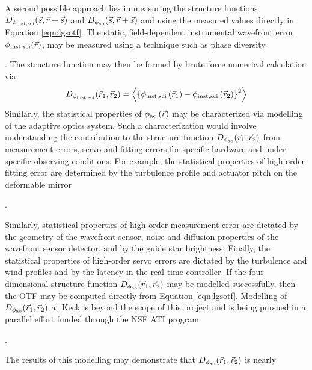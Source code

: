 A second possible approach lies in measuring the structure functions
$D_{\rm \phi_{inst,sci}}(\vec{s}, \vec{r} +\vec{s} )$ 
and
$D_{\rm \phi_{ao}}(\vec{s}, \vec{r} + \vec{s})$
and using the measured values directly in Equation
\ref{eqn:lgsotf}.  The static, field-dependent instrumental wavefront
error, $\phi_{\rm inst,sci}(\vec{r})$, may be measured using a technique 
such as phase diversity
\begin{notes}
\end{notes}
.  The
structure function may then be formed by brute force numerical
calculation via
\begin{equation}
\label{eqn:strfn_inst}
D_{\rm \phi_{inst,sci}}(\vec{r}_{1}, \vec{r}_{2})  = 
\left\langle \left\{\phi_{\rm inst,sci}\left(\vec{r}_{1}\right) - 
\phi_{\rm inst,sci}\left(\vec{r}_{2}\right)\right\}^{2}\right\rangle
\end{equation}
Similarly, the statistical properties of $\phi_{\rm
  ao}\left(\vec{r}\right)$ may be characterized via modelling
of the adaptive optics system.  Such a characterization would involve
understanding the contribution to the structure function $D_{\rm
  \phi_{ao}}(\vec{r}_{1},\vec{r}_{2})$ from measurement errors,
servo and fitting errors for specific hardware and under specific
observing conditions.  For example, the statistical properties of 
high-order fitting error are determined by the turbulence profile and
actuator pitch on the deformable mirror
\begin{notes}
[CITE].
\end{notes}
Similarly, statistical
properties of high-order measurement error are dictated by the
geometry of the wavefront sensor, noise and diffusion properties of
the wavefront sensor detector, and by the guide star brightness.  Finally,
the statistical properties of high-order servo errors are dictated by the
turbulence and wind profiles and by the latency in the real time
controller.  If the four dimensional structure function $D_{\rm
  \phi_{ao}}(\vec{r}_{1},\vec{r}_{2})$ may be modelled
successfully, then the OTF may be computed
directly from Equation \ref{eqn:lgsotf}.  Modelling of $D_{\rm
  \phi_{ao}}(\vec{r}_{1},\vec{r}_{2})$ at Keck is beyond 
the scope of this project and is being pursued in a parallel effort funded 
through the NSF ATI program 
\begin{notes}
.
\end{notes}
The results of this modelling may demonstrate that 
$D_{\rm \phi_{ao}}(\vec{r}_{1},\vec{r}_{2})$ is nearly
